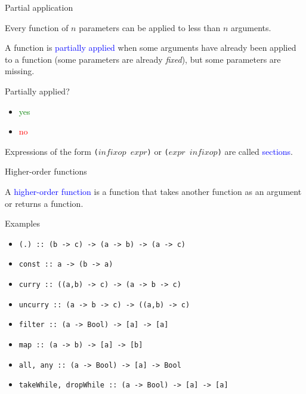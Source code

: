 \documentclass{beamer}
\def\code#1{\texttt{\frenchspacing#1}}
\begin{document}
\begin{frame}{Partial application}

Every function of $n$ parameters can be applied to less than $n$ arguments.

\pause

A function is \textcolor{blue}{partially applied} when some arguments have already been applied to a function (some parameters are already \textit{fixed}), but some parameters are missing.

\pause

\vspace{1cm}
\begin{exampleblock}{Partially applied?}
\begin{itemize}
    \item \makebox[5cm][l]{\code{elem 5}}\pause \textcolor{green}{yes}
    \item \makebox[5cm][l]{\code{(`elem` [1..5]) 0}}\pause \textcolor{red}{no}
\end{itemize}
\end{exampleblock}

\pause

\vspace{0.25cm}
Expressions of the form \code{($infixop$ $expr$)} or \code{($expr$ $infixop$)} are called \textcolor{blue}{sections}.

\end{frame}

\begin{frame}[fragile]{Higher-order functions}

A \textcolor{blue}{higher-order function} is a function that takes another function as an argument or returns a function.

\pause

\begin{exampleblock}{Examples}
\begin{itemize}
    \item \code{(.) :: (b -> c) -> (a -> b) -> (a -> c)}\pause
    \item \code{const :: a -> (b -> a)}\pause
    \item \code{curry :: ((a,b) -> c) -> (a -> b -> c)}\pause
    \item \code{uncurry :: (a -> b -> c) -> ((a,b) -> c)}\pause
    \item \code{filter :: (a -> Bool) -> [a] -> [a]}\pause
    \item \code{map :: (a -> b) -> [a] -> [b]}\pause
    \item \code{all, any :: (a -> Bool) -> [a] -> Bool}\pause
    \item \code{takeWhile, dropWhile :: (a -> Bool) -> [a] -> [a]}
\end{itemize}
\end{exampleblock}

\end{frame}
\end{document}
